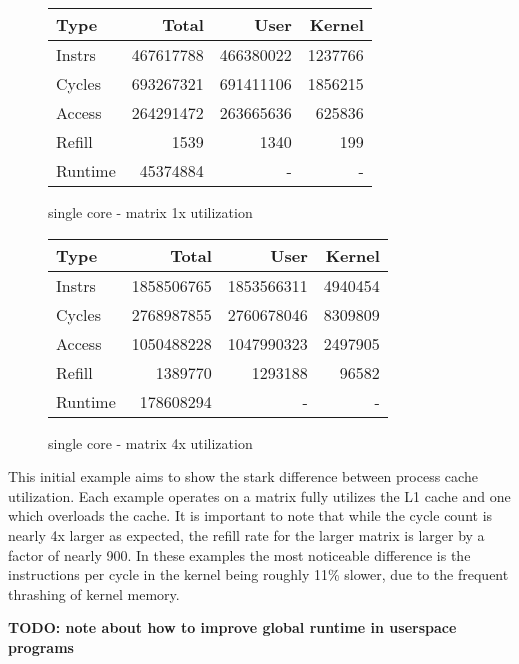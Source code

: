 \documentclass[11pt]{article}
\begin{document}
\begin{figure*}[h]
	\centering
	\begin{subtable}{.48\linewidth}
		\centering
		\begin{tabular}{ l|rrr }
			Type    & Total     & User      & Kernel  \\
			\hline
			Instrs  & 467617788 & 466380022 & 1237766 \\ 
			Cycles  & 693267321 & 691411106 & 1856215 \\ 
			Access  & 264291472 & 263665636 & 625836  \\ 
			Refill  & 1539      & 1340      & 199     \\ 
			Runtime & 45374884  & -         & -       \\ 
			\hline
		\end{tabular}
		\caption{single core - matrix 1x utilization}
	\end{subtable}
	\hfill
	\begin{subtable}{.48\linewidth}
		\centering
		\begin{tabular}{ l|rrr }
			Type    & Total      & User       & Kernel  \\
			\hline
			Instrs  & 1858506765 & 1853566311 & 4940454 \\ 
			Cycles  & 2768987855 & 2760678046 & 8309809 \\ 
			Access  & 1050488228 & 1047990323 & 2497905 \\ 
			Refill  & 1389770    & 1293188    & 96582   \\ 
			Runtime & 178608294  & -          & -       \\ 
			\hline
		\end{tabular}
		\caption{single core - matrix 4x utilization}
	\end{subtable}
\end{figure*}

This initial example aims to show the stark difference between process cache utilization.  Each example operates on a matrix fully utilizes the L1 cache and one which overloads the cache.  It is important to note that while the cycle count is nearly 4x larger as expected, the refill rate for the larger matrix is larger by a factor of nearly 900.  In these examples the most noticeable difference is the instructions per cycle in the kernel being roughly 11\% slower, due to the frequent thrashing of kernel memory. 

\textbf{TODO: note about how to improve global runtime in userspace programs}
\end{document}

